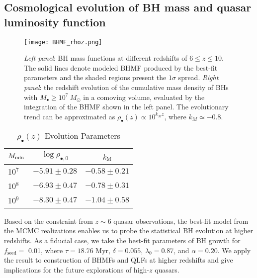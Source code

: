 \documentclass[twocolumn, twocolappendix]{aastex63}
\newcommand{\Msun}{M_\odot}
\newcommand{\Mbh}{M_\bullet}
\newcommand{\tlife}{\tau}
\newcommand{\fseed}{f_\mathrm{seed}}
\newcommand{\red}[1]{\textcolor{red}{ #1}}
\begin{document}
\begin{CJK*}{UTF8}{gbsn}
\vspace{2mm}
\section{Cosmological evolution of BH mass and quasar luminosity function}\label{sec:cosm}


\begin{figure*}
\centering
\texttt{[image: BHMF\_rhoz.png]}
\caption{
{\it Left panel}: BH mass functions at different redshifts of $6\leq z \leq 10$.
The solid lines denote modeled BHMF produced by the best-fit parameters 
and the shaded regions present the $1\sigma$ spread. 
{\it Right panel}: the redshift evolution of the cumulative mass density of BHs with $\Mbh \geq 10^7~\Msun$ in a comoving volume, 
evaluated by the integration of the BHMF shown in the left panel.
The evolutionary trend can be approximated as $\rho_\bullet (z) \propto 10^{k_M z}$, where $k_M\simeq -0.8$.
}
\label{fig:BHMF_rhoz}
\end{figure*}


\begin{table}
\renewcommand\thetable{1} %
\caption{$\rho_\bullet(z)$ Evolution Parameters}
\begin{center}
\begin{tabular}{l c r}
\hline
$M_{\rm min}$ & $\log \rho_{\bullet,0}$ & $k_{\rm M}$ ~~~ \\ 
\hline 
\hline
10$^7$  &  $-5.91\pm 0.28$  &  $-0.58 \pm 0.21$  \\
10$^8$  &  $-6.93\pm 0.47$  &  $-0.78 \pm 0.31$  \\
10$^9$  &  $-8.30\pm 0.47$  &  $-1.04 \pm 0.58$ \\
\hline 
\end{tabular}
\label{tab:MFz}
\end{center}
\end{table}  

Based on the constraint from $z\sim 6$ quasar observations, the best-fit model from the MCMC realizations enables
us to probe the statistical BH evolution at higher redshifts.
As a fiducial case, we take the best-fit parameters of BH growth for $\fseed=$ 0.01,
where $\tlife=18.76$ Myr, $\delta=0.055$, $\lambda_0=0.87$, and $\alpha=0.20$.
We apply the result to construction of BHMFs and QLFs at higher redshifts and give implications for
the future explorations of high-$z$ quasars.




\end{CJK*}
\end{document}
